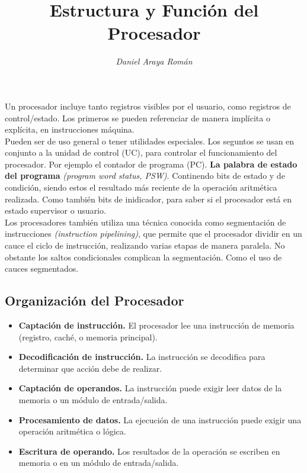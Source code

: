 \documentclass{article}
\title{\LARGE\textbf{Estructura y Función del Procesador}}
\author{\large\textit{Daniel Araya Román}}
\date{}
\begin{document}
\maketitle

Un procesador incluye tanto registros visibles por el usuario, como registros
de control/estado. Los primeros se pueden referenciar de manera impl\'{i}cita o
expl\'{i}cita, en instrucciones m\'{a}quina. \\

Pueden ser de uso general o tener
utilidades especiales. Los seguntos se usan en conjunto a la unidad de control (UC),
para controlar el funcionamiento del procesador. Por ejemplo el contador de
programa (PC). \textbf{La palabra de estado del programa}
\textit{(program word status, PSW)}. Continendo bits de estado y de
condici\'{o}n, siendo estos el resultado m\'{a}s reciente de la
operaci\'{o}n aritm\'{e}tica realizada. Como tambi\'{e}n bits de inidicador,
para saber si el procesador est\'{a} en estado supervisor o usuario. \\

Los procesadores tambi\'{e}n utiliza una t\'{e}cnica conocida como segmentaci\'{o}n
de instrucciones \textit{(instruction pipelining)}, que permite que el procesador
dividir en un cauce el ciclo de instrucci\'{o}n, realizando varias etapas de manera
paralela. No obstante los saltos condicionales complican la segmentaci\'{o}n. Como
el uso de cauces segmentados.

\subsection*{Organización del Procesador}
\begin{itemize}
      \item \textbf{Captaci\'{o}n de instrucci\'{o}n.}
            El procesador lee una instrucci\'{o}n de memoria (registro, cach\'{e}, o
            memoria principal).
      \item \textbf{Decodificaci\'{o}n de instrucci\'{o}n.}
            La instrucci\'{o}n se decodifica para determinar que acci\'{o}n debe
            de realizar.
      \item  \textbf{Captaci\'{o}n de operandos.}
            La instrucci\'{o}n puede exigir leer datos de la memoria o un m\'{o}dulo
            de entrada/salida.
      \item \textbf{Procesamiento de datos.}
            La ejecuci\'{o}n de una instrucci\'{o}n puede exigir una operaci\'{o}n
            aritm\'{e}tica o l\'{o}gica.
      \item \textbf{Escritura de operando.}
            Los resultados de la operaci\'{o}n se escriben en memoria o en un
            m\'{o}dulo de entrada/salida.
\end{itemize}
\end{document}
